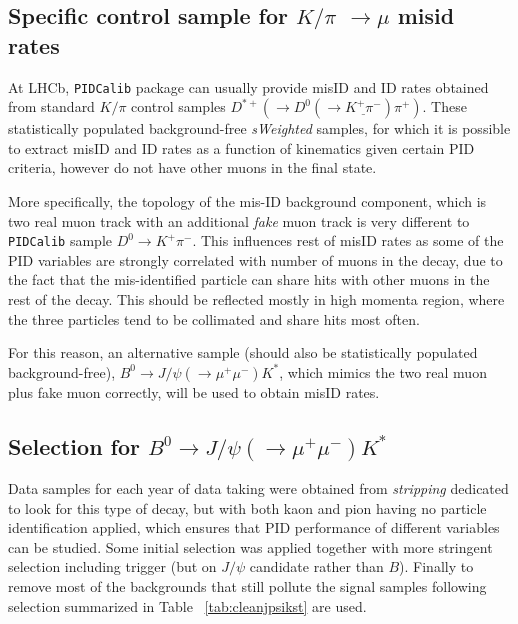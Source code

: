 \subsection{Specific control sample for $K/\pi$ $\rightarrow \mu$ misid rates }
\label{extraction}
At LHCb, \texttt{PIDCalib} package can usually provide misID and ID rates obtained from standard $K/\pi$ control samples $D^{*+}(\rightarrow D^{0}(\rightarrow \underline{K^{+} \pi^{-}}) \pi^{+})$. These statistically populated background-free \textit{sWeighted} samples, for which it is possible to extract misID and ID rates as a function of kinematics given certain \gls{PID} criteria, however do not have other muons in the final state. 

More specifically, the topology of the mis-ID background component, which is two real muon track with an additional \textit{fake} muon track is very different to \texttt{PIDCalib} sample $D^{0} \rightarrow K^{+} \pi^{-}$. This influences rest of misID rates as some of the \gls{PID} variables are strongly correlated with number of muons in the decay, due to the fact that the mis-identified particle can share hits with other muons in the rest of the decay. This should be reflected mostly in high momenta region, where the three particles tend to be collimated and share hits most often.

For this reason, an alternative sample (should also be statistically populated background-free), $B^{0} \rightarrow J/\psi(\rightarrow \mu^{+} \mu^{-}) K^{*}$, which mimics the two real muon plus fake muon correctly, will be used to obtain misID rates.

\subsection{Selection for $B^{0} \rightarrow J/\psi(\rightarrow \mu^{+} \mu^{-}) K^{*}$  }
Data samples for each year of data taking were obtained from \textit{stripping} dedicated to look for this type of decay, but with both kaon and pion having no particle identification applied, which ensures that \gls{PID} performance of different variables can be studied. Some initial selection was applied together with more stringent \Bmumumu selection including trigger (but on $J/\psi$ candidate rather than $B$). Finally to remove most of the backgrounds that still pollute the signal samples following selection summarized in Table ~\ref{tab:cleanjpsikst} are used.


